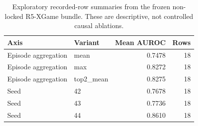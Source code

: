 \begin{table}[t]
\centering
\caption{Exploratory recorded-row summaries from the frozen non-locked R5-XGame bundle. These are
descriptive, not controlled causal ablations.}
\label{tab:r6-ablation-results}
\small
\begin{tabular}{llrr}
\toprule
Axis & Variant & Mean AUROC & Rows \\
\midrule
Episode aggregation & mean & 0.7478 & 18 \\
Episode aggregation & max & 0.8272 & 18 \\
Episode aggregation & top2\_mean & 0.8275 & 18 \\
\midrule
Seed & 42 & 0.7678 & 18 \\
Seed & 43 & 0.7736 & 18 \\
Seed & 44 & 0.8610 & 18 \\
\bottomrule
\end{tabular}
\end{table}
